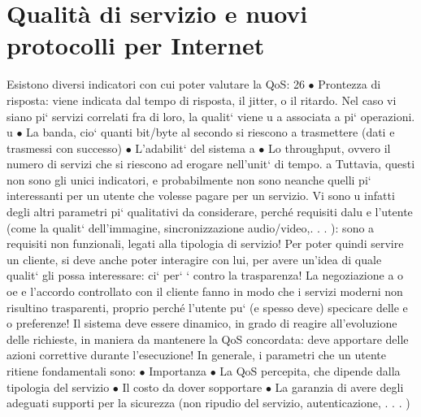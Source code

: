 \documentclass[a4paper,12pt]{article}
\begin{document}
\section{Qualità di servizio e nuovi protocolli per Internet}
Esistono diversi indicatori con cui poter valutare la QoS:
26
$\bullet$ Prontezza di risposta: viene indicata dal tempo di risposta, il jitter, o il
ritardo. Nel caso vi siano pi` servizi correlati fra di loro, la qualit` viene
u
a
associata a pi` operazioni.
u
$\bullet$ La banda, cio` quanti bit/byte al secondo si riescono a trasmettere (dati
e
trasmessi con successo)
$\bullet$ L'adabilit` del sistema
a
$\bullet$ Lo throughput, ovvero il numero di servizi che si riescono ad erogare
nell'unit` di tempo.
a
Tuttavia, questi non sono gli unici indicatori, e probabilmente non sono neanche
quelli pi` interessanti per un utente che volesse pagare per un servizio. Vi sono
u
infatti degli altri parametri pi` qualitativi da considerare, perché requisiti dalu
e
l'utente (come la qualit` dell'immagine, sincronizzazione audio/video,. . . ): sono
a
requisiti non funzionali, legati alla tipologia di servizio! Per poter quindi servire
un cliente, si deve anche poter interagire con lui, per avere un'idea di quale
qualit` gli possa interessare: ci` per` ` contro la trasparenza! La negoziazione
a
o
oe
e l'accordo controllato con il cliente fanno in modo che i servizi moderni non
risultino trasparenti, proprio perché l'utente pu` (e spesso deve) specicare delle
e
o
preferenze! Il sistema deve essere dinamico, in grado di reagire all'evoluzione
delle richieste, in maniera da mantenere la QoS concordata: deve apportare
delle azioni correttive durante l'esecuzione! In generale, i parametri che un
utente ritiene fondamentali sono:
$\bullet$ Importanza
$\bullet$ La QoS percepita, che dipende dalla tipologia del servizio
$\bullet$ Il costo da dover sopportare
$\bullet$ La garanzia di avere degli adeguati supporti per la sicurezza (non ripudio
del servizio, autenticazione, . . . )
\end{document}
